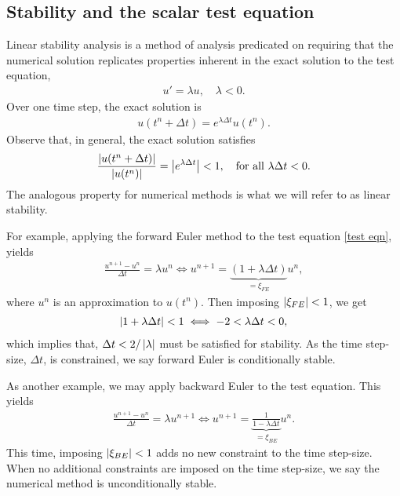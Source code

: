 \subsection{Stability and the scalar test equation}
Linear stability analysis is a method of analysis predicated on requiring that the numerical solution replicates properties inherent in the exact solution to the test equation,
\begin{align}
u' = \lambda u, 
\quad \lambda < 0.
\label{test eqn}
\end{align}  
Over one time step, the exact solution is 
\begin{align}
u(t^n + \Delta t) = e^{\lambda \Delta t} u(t^n).
\end{align}
Observe that, in general, the exact solution satisfies
\begin{align}
\frac{\left|u(t^n + \Delta t)\right|}{\left|u(t^n)\right|}
= \left|e^{\lambda\Delta t} \right| 
< 1,
\quad\text{for all } \lambda\Delta t < 0.
\end{align}
The analogous property for numerical methods is what we will refer to as linear stability.

For example, applying the forward Euler method to the test equation \cref{test eqn}, yields
\begin{align}
\frac{u^{n+1} - u^n}{\Delta t} = \lambda u^n 
\iff u^{n+1} = \underbrace{(1 + \lambda \Delta t)}_{=\xi_{FE}} u^n, 
\end{align}
where $u^n$ is an approximation to $u(t^n)$. Then imposing $\left|\xi_{FE}\right| < 1$, we get 
\begin{align}
\left|1+ \lambda\Delta t\right| < 1 
\iff -2 < \lambda\Delta t < 0,
\end{align}
which implies that, $\Delta t < 2/\left|\lambda\right|$ must be satisfied for stability. As the time step-size, $\Delta t$, is constrained, we say forward Euler is conditionally stable. 

As another example, we may apply backward Euler to the test equation. This yields
\begin{align}
\frac{u^{n+1} - u^n}{\Delta t} = \lambda u^{n+1} 
\iff 
u^{n+1} = \underbrace{\frac{1}{1 - \lambda\Delta t}}_{=\xi_{BE}} u^n.
\end{align}
This time, imposing $\left|\xi_{BE}\right|<1$ adds no new constraint to the time step-size. When no additional constraints are imposed on the time step-size, we say the numerical method is unconditionally stable.

